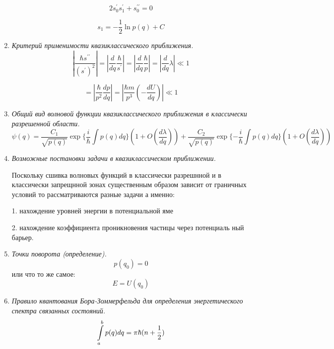 \documentclass{article}
\begin{document}
\begin{enumerate}
\begin{equation}
2s{}_{0}^{\prime}s{}_{1}^{\prime}+s{}_{0}^{\prime\prime}=0
\end{equation}


\begin{equation}
s_{1}=-\frac{1}{2}\ln p(q)+C
\end{equation}


		\item \textit{Критерий применимости квазиклассического приближения.}  
\begin{equation}
|\frac{\hbar s^{\prime\prime}}{(s^{\prime})^{2}}|=|\frac{d}{dq}\frac{\hbar}{s^{\prime}}|=|\frac{d}{dq}\frac{\hbar}{p}|=|\frac{d}{dq}\lambda|\ll1
\end{equation}


\begin{equation}
=|\frac{\hbar}{p^{2}}\frac{dp}{dq}|=|\frac{\hbar m}{p^{3}}(-\frac{dU}{dq})|\ll1
\end{equation}


		\item \textit{Общий вид волновой функции квазиклассического приближения в классически разрешенной области.} 
\begin{equation}
\psi(q)=\frac{C_{1}}{\sqrt{p(q)}}\exp\{\frac{i}{\hbar}\int p(q)dq\}(1+O(\frac{d\lambda}{dq}))+\frac{C_{2}}{\sqrt{p(q)}}\exp\{-\frac{i}{\hbar}\int p(q)dq\}(1+O(\frac{d\lambda}{dq}))
\end{equation}


		\item \textit{Возможные постановки задачи в квазиклассическом приближении.} 
		
		Поскольку сшивка волновых функций в классически разрешнной и в
классически запрещнной зонах существенным образом зависит от граничных
условий то рассматриваются разные задачи а именно:

1. нахождение уровней энергии в потенциальной яме

2. нахождение коэффициента проникновения частицы через потенциаль
ный барьер.

		\item \textit{Точки поворота (определение).}  
\begin{equation}
p(q_{0})=0
\end{equation}
или что то же самое:
\begin{equation}
E=U(q_{0})
\end{equation}


		\item \textit{Правило квантования Бора-Зоммерфельда для определения энергетического спектра связанных состояний.}  
\begin{equation}
\intop_{a}^{b}p(q)dq=\pi\hbar(n+\frac{1}{2})
\end{equation}



\end{enumerate}
\end{document}
